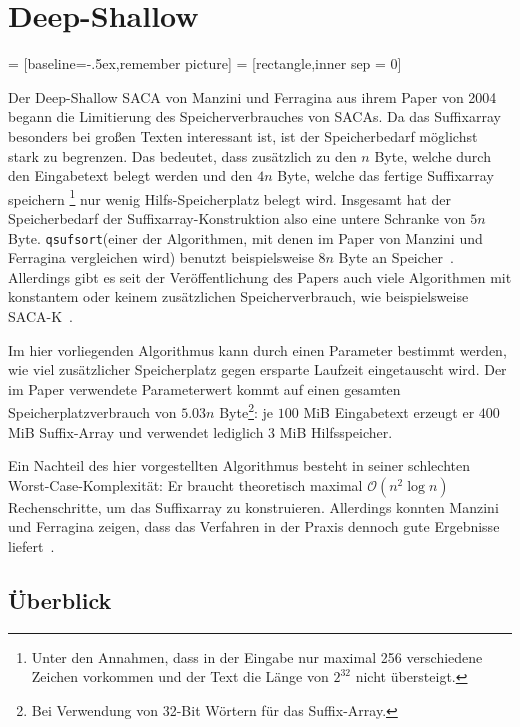 \section{Deep-Shallow}
 = [baseline=-.5ex,remember picture]
 = [rectangle,inner sep = 0]

\def\divsufsort{\texttt{divsufsort}\xspace}
\def\qsufsort{\texttt{qsufsort}\xspace}
\def\cache{\texttt{cache}\xspace}

Der  Deep-Shallow SACA von Manzini und Ferragina aus ihrem Paper von 2004~\cite{saca:4} begann die Limitierung des Speicherverbrauches von SACAs.
Da das Suffixarray besonders bei großen Texten interessant ist, ist der Speicherbedarf möglichst stark zu begrenzen.
Das bedeutet, dass zusätzlich zu den $n$ Byte, welche durch den Eingabetext belegt werden und den $4n$ Byte, welche das fertige Suffixarray speichern
\footnote{Unter den Annahmen, dass in der Eingabe nur maximal 256 verschiedene Zeichen vorkommen und der Text die Länge von $2^{32}$ nicht übersteigt.}
nur wenig Hilfs-Speicherplatz belegt wird.
Insgesamt hat der Speicherbedarf der Suffixarray-Konstruktion also eine untere Schranke von $5n$ Byte.
\qsufsort (einer der Algorithmen, mit denen im Paper von Manzini und Ferragina vergleichen wird) benutzt beispielsweise $8n$ Byte an Speicher~\cite{saca:4}.
Allerdings gibt es seit der Veröffentlichung des Papers auch viele Algorithmen mit konstantem oder keinem zusätzlichen Speicherverbrauch, wie beispielsweise SACA-K~\cite{saca:7}.

Im hier vorliegenden Algorithmus kann durch einen Parameter bestimmt werden, wie viel zusätzlicher Speicherplatz gegen ersparte Laufzeit eingetauscht wird.
Der im Paper verwendete Parameterwert kommt auf einen gesamten Speicherplatzverbrauch von $5.03n$ Byte\footnote{Bei Verwendung von 32-Bit Wörtern für das Suffix-Array.}:
je $100$ MiB Eingabetext erzeugt er $400$ MiB Suffix-Array und verwendet lediglich 3 MiB Hilfsspeicher.

Ein Nachteil des hier vorgestellten Algorithmus besteht in seiner schlechten Worst-Case-Komplexität:
Er braucht theoretisch maximal $\mathcal O(n^2 \log n)$ Rechenschritte, um das Suffixarray zu konstruieren.
Allerdings konnten Manzini und Ferragina zeigen, dass das Verfahren in der Praxis dennoch gute Ergebnisse liefert~\cite{saca:4}.

\subsection{Überblick}

